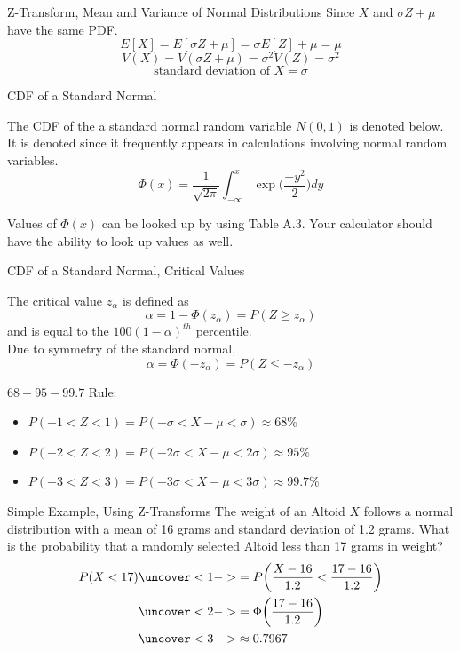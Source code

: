 \documentclass[handout]{beamer}
\newcommand{\nl}[1]{\vspace{#1 em}}
\begin{document}
\begin{frame}{Z-Transform, Mean and Variance of Normal Distributions}
    Since $X$ and $\sigma Z + \mu$ have the same PDF.
    $$ E[X] = E[\sigma Z + \mu] = \sigma E[Z] + \mu = \mu $$
    $$ V(X) = V(\sigma Z + \mu) = \sigma^2 V(Z) =\sigma^2 $$
    $$ \text{standard deviation of } X = \sigma  $$
    \vfill
\end{frame}
\begin{frame}{CDF of a Standard Normal}
    \begin{block}{}
        The CDF of the a standard normal random variable $N(0,1)$ is denoted below. It is denoted since it frequently appears in calculations involving normal random variables.
        $$\Phi(x) = \frac{1}{\sqrt{2\pi}}\int_{-\infty}^x \exp \bigg(\frac{-y^2}{2}\bigg) dy$$
    \end{block}
    Values of $\Phi(x)$ can be looked up by using Table A.3. Your calculator should have the ability to look up values as well.
    \vfill
\end{frame}
\begin{frame}{CDF of a Standard Normal, Critical Values}
    \begin{block}{}
        The critical value $z_\alpha$ is defined as
        $$ \alpha = 1 - \Phi(z_\alpha) = P(Z\geq z_\alpha)$$
        and is equal to the $100(1-\alpha)^{th}$ percentile.
        \\
        Due to symmetry of the standard normal,
        $$ \alpha = \Phi(-z_\alpha) = P(Z\leq -z_\alpha)$$
    \end{block}
    $68-95-99.7$ Rule:
    \begin{itemize}
        \item $P(-1<Z<1)=P(-\sigma <X-\mu < \sigma)\approx 68\%$
        \item $P(-2<Z<2)=P(-2\sigma <X-\mu < 2\sigma)\approx 95\%$
        \item $P(-3<Z<3)=P(-3\sigma <X-\mu < 3\sigma)\approx 99.7\%$
    \end{itemize}
    \vfill
\end{frame}
\begin{frame}{Simple Example, Using Z-Transforms}
    The weight of an Altoid $X$ follows a normal distribution with a mean of 16 grams and standard deviation of 1.2 grams. What is the probability that a randomly selected Altoid less than 17 grams in weight?
    \\ \nl{0.5}
    \begin{align*}
        P(X<17) & \uncover<1->{= P\bigg(\frac{X-16}{1.2}< \frac{17-16}{1.2}\bigg)}\\
        & \uncover<2->{ = \Phi\bigg(\frac{17-16}{1.2}\bigg)} \\
        & \uncover<3->{ \approx 0.7967} \\
    \end{align*}
    \vfill
\end{frame}
\end{document}
